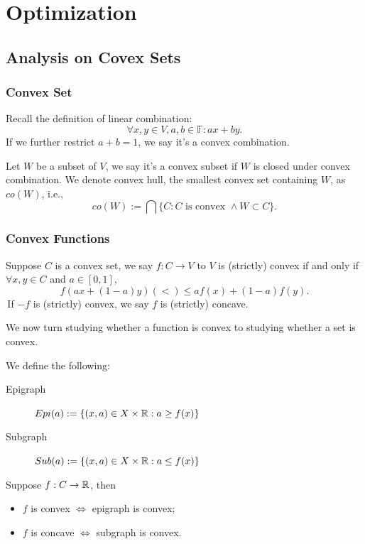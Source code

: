 \chapter{Optimization}
\section{Analysis on Covex Sets}
\subsection{Convex Set}
Recall the definition of linear combination:
$$\forall x,y \in V, a,b \in \mathbb{F}: ax+by.$$
If we further restrict $a+b=1$, we say it's a convex combination. 
\begin{definition}
    Let $W$ be a subset of $V$, we say it's a convex subset if $W$ is closed under convex combination. We denote convex hull, the smallest convex set containing $W$, as $co(W)$, i.e.,
    $$co(W):=\bigcap\{C: C \text{ is convex } \land W\subset C\}.$$ 
\end{definition}
\subsection{Convex Functions}
\begin{definition}
    Suppose $C$ is a convex set, we say $f: C\to V$ to $V$ is (strictly) convex if and only if 
$\forall x,y\in C$ and $a\in [0,1]$, $$f(ax+(1-a)y) (<)\leq af(x)+(1-a)f(y).$$
\,If $-f$ is (strictly) convex, we say $f$ is (strictly) concave.
\end{definition}

We now turn studying whether a function is convex to studying whether a set is convex.
\begin{definition}
    We define the following:
    \begin{description}
        \item[Epigraph] $Epi(a):=\{(x,a) \in X\times \mathbb{R}: a\geq f(x)\}$
        \item[Subgraph] $Sub(a):=\{(x,a) \in X\times \mathbb{R}: a\leq f(x)\}$
    \end{description}
\end{definition}

\begin{proposition}
    Suppose $f:C\to \mathbb{R}$, then 
    \begin{itemize}
        \item $f$ is convex $\iff$ epigraph is convex;
        \item $f$ is concave $\iff$ subgraph is convex.
    \end{itemize}
\end{proposition}
